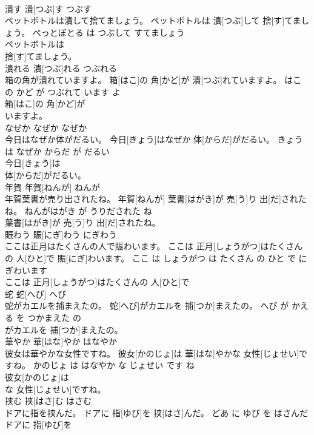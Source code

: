 \documentclass[8pt]{extreport}
\begin{document}
\begin{CJK}{UTF8}{min}
\\	潰す	潰[つぶ]す	つぶす	
\\	ペットボトルは潰して捨てましょう。	ペットボトルは 潰[つぶ]して 捨[す]てましょう。	ぺっとぼとる は つぶして すてましょう	
\\	ペットボトルは
\\	捨[す]てましょう。			
\\	潰れる	潰[つぶ]れる	つぶれる	
\\	箱の角が潰れていますよ。	箱[はこ]の 角[かど]が 潰[つぶ]れていますよ。	はこ の かど が つぶれて います よ	
\\	箱[はこ]の 角[かど]が
\\	いますよ。			
\\	なぜか	なぜか	なぜか	
\\	今日はなぜか体がだるい。	今日[きょう]はなぜか 体[からだ]がだるい。	きょう は なぜか からだ が だるい	
\\	今日[きょう]は
\\	体[からだ]がだるい。			
\\	年賀	年賀[ねんが]	ねんが	
\\	年賀葉書が売り出されたね。	年賀[ねんが] 葉書[はがき]が 売[う]り 出[だ]されたね。	ねんがはがき が うりだされた ね	
\\	葉書[はがき]が 売[う]り 出[だ]されたね。			
\\	賑わう	賑[にぎ]わう	にぎわう	
\\	ここは正月はたくさんの人で賑わいます。	ここは 正月[しょうがつ]はたくさんの 人[ひと]で 賑[にぎ]わいます。	ここ は しょうがつ は たくさん の ひと で にぎわいます	
\\	ここは 正月[しょうがつ]はたくさんの 人[ひと]で
\\	蛇	蛇[へび]	へび	
\\	蛇がカエルを捕まえたの。	蛇[へび]がカエルを 捕[つか]まえたの。	へび が かえる を つかまえた の	
\\	がカエルを 捕[つか]まえたの。			
\\	華やか	華[はな]やか	はなやか	
\\	彼女は華やかな女性ですね。	彼女[かのじょ]は 華[はな]やかな 女性[じょせい]ですね。	かのじょ は はなやか な じょせい です ね	
\\	彼女[かのじょ]は
\\	な 女性[じょせい]ですね。			
\\	挟む	挟[はさ]む	はさむ	
\\	ドアに指を挟んだ。	ドアに 指[ゆび]を 挟[はさ]んだ。	どあ に ゆび を はさんだ	
\\	ドアに 指[ゆび]を

\end{CJK}
\end{document}
